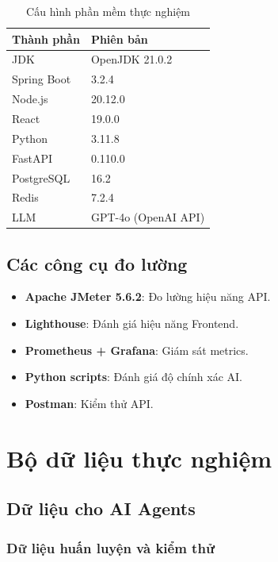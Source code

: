 \documentclass[12pt,a4paper]{report}
\begin{document}
\begin{table}[H]
\centering
\caption{Cấu hình phần mềm thực nghiệm}
\begin{tabular}{|p{5cm}|p{8cm}|}
\hline
\textbf{Thành phần} & \textbf{Phiên bản} \\
\hline
JDK & OpenJDK 21.0.2 \\
\hline
Spring Boot & 3.2.4 \\
\hline
Node.js & 20.12.0 \\
\hline
React & 19.0.0 \\
\hline
Python & 3.11.8 \\
\hline
FastAPI & 0.110.0 \\
\hline
PostgreSQL & 16.2 \\
\hline
Redis & 7.2.4 \\
\hline
LLM & GPT-4o (OpenAI API) \\
\hline
\end{tabular}
\label{tab:sw_config}
\end{table}

\subsection{Các công cụ đo lường}

\begin{itemize}
\item \textbf{Apache JMeter 5.6.2}: Đo lường hiệu năng API.
\item \textbf{Lighthouse}: Đánh giá hiệu năng Frontend.
\item \textbf{Prometheus + Grafana}: Giám sát metrics.
\item \textbf{Python scripts}: Đánh giá độ chính xác AI.
\item \textbf{Postman}: Kiểm thử API.
\end{itemize}

\section{Bộ dữ liệu thực nghiệm}

\subsection{Dữ liệu cho AI Agents}

\subsubsection{Dữ liệu huấn luyện và kiểm thử}
\end{document}
